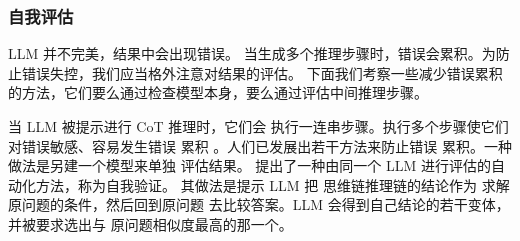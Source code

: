 


\subsubsection{自我评估}
LLM 并不完美，结果中会出现错误。
当生成多个推理步骤时，错误会累积。为防止错误失控，我们应当格外注意对结果的评估。
%
下面我们考察一些减少错误累积的方法，它们要么通过检查模型本身，要么通过评估中间推理步骤。



当 LLM 被提示进行 CoT 推理时，它们会
执行一连串步骤。执行多个步骤使它们
对错误敏感、容易发生错误
累积 %
\citep{weng2022large,xiao2023survey}。人们已发展出若干方法来防止错误
累积。一种做法是另建一个模型来单独
评估结果。%
%
\citet{weng2022large} 提出了一种由同一个 LLM 进行评估的自动化方法，称为自我验证。%
其做法是提示 LLM 把
思维链推理链的结论作为
求解原问题的条件，然后回到原问题
去比较答案。LLM 会得到自己结论的若干变体，并被要求选出与
原问题相似度最高的那一个。%




